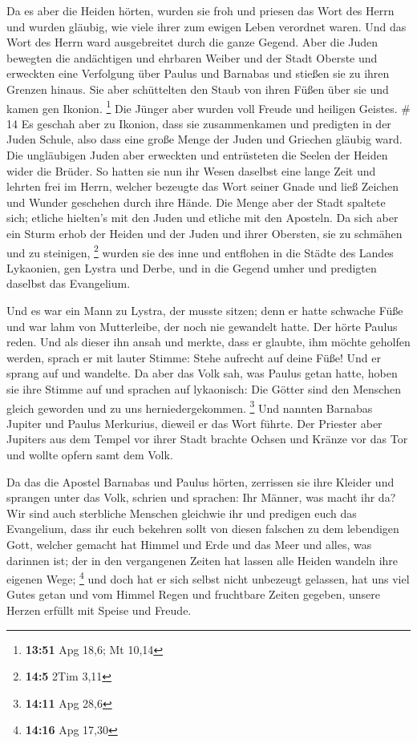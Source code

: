  Da es aber die Heiden hörten, wurden sie froh und
priesen das Wort des Herrn und wurden gläubig, wie viele ihrer zum
ewigen Leben verordnet waren.  Und das Wort des Herrn
ward ausgebreitet durch die ganze Gegend.  Aber die Juden
bewegten die andächtigen und ehrbaren Weiber und der Stadt Oberste und
erweckten eine Verfolgung über Paulus und Barnabas und stießen sie zu
ihren Grenzen hinaus.  Sie aber schüttelten den Staub von
ihren Füßen über sie und kamen gen Ikonion. \footnote{\textbf{13:51} Apg
  18,6; Mt 10,14}  Die Jünger aber wurden voll Freude und
heiligen Geistes. \# 14  Es geschah aber zu Ikonion, dass
sie zusammenkamen und predigten in der Juden Schule, also dass eine
große Menge der Juden und Griechen gläubig ward.  Die
ungläubigen Juden aber erweckten und entrüsteten die Seelen der Heiden
wider die Brüder.  So hatten sie nun ihr Wesen daselbst
eine lange Zeit und lehrten frei im Herrn, welcher bezeugte das Wort
seiner Gnade und ließ Zeichen und Wunder geschehen durch ihre Hände.
 Die Menge aber der Stadt spaltete sich; etliche hielten's
mit den Juden und etliche mit den Aposteln.  Da sich aber
ein Sturm erhob der Heiden und der Juden und ihrer Obersten, sie zu
schmähen und zu steinigen, \footnote{\textbf{14:5} 2Tim 3,11}
 wurden sie des inne und entflohen in die Städte des
Landes Lykaonien, gen Lystra und Derbe, und in die Gegend umher
 und predigten daselbst das Evangelium.

 Und es war ein Mann zu Lystra, der musste sitzen; denn er
hatte schwache Füße und war lahm von Mutterleibe, der noch nie gewandelt
hatte.  Der hörte Paulus reden. Und als dieser ihn ansah
und merkte, dass er glaubte, ihm möchte geholfen werden, 
sprach er mit lauter Stimme: Stehe aufrecht auf deine Füße! Und er
sprang auf und wandelte.  Da aber das Volk sah, was
Paulus getan hatte, hoben sie ihre Stimme auf und sprachen auf
lykaonisch: Die Götter sind den Menschen gleich geworden und zu uns
herniedergekommen. \footnote{\textbf{14:11} Apg 28,6} 
Und nannten Barnabas Jupiter und Paulus Merkurius, dieweil er das Wort
führte.  Der Priester aber Jupiters aus dem Tempel vor
ihrer Stadt brachte Ochsen und Kränze vor das Tor und wollte opfern samt
dem Volk.

 Da das die Apostel Barnabas und Paulus hörten, zerrissen
sie ihre Kleider und sprangen unter das Volk, schrien 
und sprachen: Ihr Männer, was macht ihr da? Wir sind auch sterbliche
Menschen gleichwie ihr und predigen euch das Evangelium, dass ihr euch
bekehren sollt von diesen falschen zu dem lebendigen Gott, welcher
gemacht hat Himmel und Erde und das Meer und alles, was darinnen ist;
 der in den vergangenen Zeiten hat lassen alle Heiden
wandeln ihre eigenen Wege; \footnote{\textbf{14:16} Apg 17,30}
 und doch hat er sich selbst nicht unbezeugt gelassen,
hat uns viel Gutes getan und vom Himmel Regen und fruchtbare Zeiten
gegeben, unsere Herzen erfüllt mit Speise und Freude.


